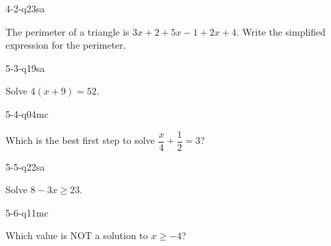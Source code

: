 \begin{practiceQuestion}{4-2-q23}{sa}
\begin{questionText}
The perimeter of a triangle is $3x + 2 + 5x - 1 + 2x + 4$. Write the simplified expression for the perimeter.
\end{questionText}
\end{practiceQuestion}

\begin{practiceQuestion}{5-3-q19}{sa}
\begin{questionText}
Solve $4(x + 9) = 52$.
\end{questionText}
\end{practiceQuestion}

\begin{practiceQuestion}{5-4-q04}{mc}
\begin{questionText}
Which is the best first step to solve $\dfrac{x}{4} + \dfrac{1}{2} = 3$?
\end{questionText}
\end{practiceQuestion}

\begin{practiceQuestion}{5-5-q22}{sa}
\begin{questionText}
Solve $8 - 3x \geq 23$.
\end{questionText}
\end{practiceQuestion}

\begin{practiceQuestion}{5-6-q11}{mc}
\begin{questionText}
Which value is NOT a solution to $x \geq -4$?
\end{questionText}
\end{practiceQuestion}


